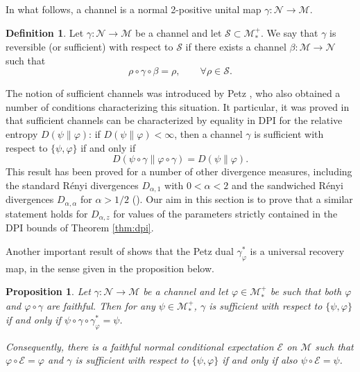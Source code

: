 \documentclass[12pt]{article}
\newtheorem{prop}[theorem]{Proposition}
\theoremstyle{definition}
\newtheorem{defi}[theorem]{Definition}
\theoremstyle{remark}
\numberwithin{equation}{section}
\def\Me{\mathcal M}
\def\Ne{\mathcal N}
\def\ffi{\varphi}
\begin{document}
In what follows, a channel is a normal 2-positive unital map $\gamma: \Ne\to \Me$.

\begin{defi} Let $\gamma:\Ne\to \Me$ be a channel and let $\mathcal S \subset
\Me_*^+$. We say that $\gamma$ is reversible (or sufficient) with respect to $\mathcal S$
if there exists a channel $\beta:\Me\to \Ne$ such that
\[
\rho\circ\gamma\circ\beta=\rho,\qquad \forall \rho\in \mathcal S.
\]

\end{defi}

The notion of sufficient channels was introduced by Petz
\cite{petz1986sufficient,petz1988sufficiency}, who also obtained a number of conditions
characterizing this situation. It particular, it was proved in \cite{petz1988sufficiency}
that sufficient channels can be characterized by equality in DPI for the relative entropy
$D(\psi\|\varphi)$: if $D(\psi\|\varphi)<\infty$, then a channel $\gamma$ is sufficient
with respect to $\{\psi,\varphi\}$ if and only if 
\[
D(\psi\circ\gamma\|\varphi\circ\gamma)=D(\psi\|\varphi). 
\]
This result has been proved for a number of other divergence measures, including the
standard R\'enyi divergences $D_{\alpha,1}$ with $0<\alpha<2$  and the sandwiched
R\'enyi divergences $D_{\alpha,\alpha}$ for $\alpha>1/2$
(\cite{jencova2018renyi,jencova2021renyi}).
Our aim in this section is to prove that a similar statement holds for $D_{\alpha,z}$ for
values of the parameters strictly contained in the DPI bounds of Theorem \ref{thm:dpi}. 



Another important result of \cite{petz1988sufficiency} shows that the Petz dual $\gamma_\varphi^*$ is a universal
recovery map, in the sense given in the proposition below. 

\begin{prop}\label{prop:universal} Let $\gamma:\Ne\to \Me$ be a channel and let
$\varphi\in \Me_*^+$ be such that both $\ffi$ and $\ffi\circ\gamma$ are faithful. Then for any $\psi\in \Me_*^+$, $\gamma$ is
sufficient with respect to $\{\psi,\varphi\}$ if and only if $\psi\circ\gamma\circ
\gamma_\varphi^*=\psi$.

Consequently, there is a faithful normal conditional expectation $\mathcal E$ on $\Me$
such that $\varphi\circ \mathcal E=\varphi$ and $\gamma$ is sufficient with respect to
$\{\psi,\varphi\}$ if and only if also $\psi\circ\mathcal E=\psi$.

\end{prop}
\end{document}
